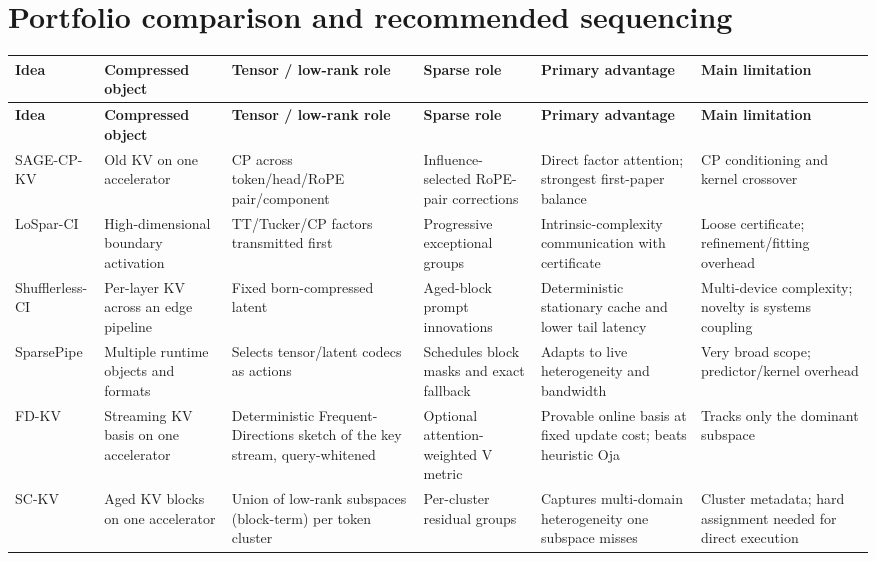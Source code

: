 \documentclass[10pt]{article}
\begin{document}
\section{Portfolio comparison and recommended sequencing}

\small
\renewcommand{\arraystretch}{1.18}
\begin{longtable}{@{}P{2.25cm}P{2.35cm}P{2.5cm}P{2.65cm}P{2.65cm}P{2.15cm}@{}}
\toprule
\textbf{Idea} & \textbf{Compressed object} & \textbf{Tensor / low-rank role} &
\textbf{Sparse role} & \textbf{Primary advantage} & \textbf{Main limitation} \\
\midrule
\endfirsthead
\toprule
\textbf{Idea} & \textbf{Compressed object} & \textbf{Tensor / low-rank role} &
\textbf{Sparse role} & \textbf{Primary advantage} & \textbf{Main limitation} \\
\midrule
\endhead
SAGE-CP-KV & Old KV on one accelerator & CP across token/head/RoPE pair/component &
Influence-selected RoPE-pair corrections & Direct factor attention; strongest first-paper
balance & CP conditioning and kernel crossover \\
LoSpar-CI & High-dimensional boundary activation & TT/Tucker/CP factors transmitted first &
Progressive exceptional groups & Intrinsic-complexity communication with certificate &
Loose certificate; refinement/fitting overhead \\
Shufflerless-CI & Per-layer KV across an edge pipeline & Fixed born-compressed latent &
Aged-block prompt innovations & Deterministic stationary cache and lower tail latency &
Multi-device complexity; novelty is systems coupling \\
SparsePipe & Multiple runtime objects and formats & Selects tensor/latent codecs as actions &
Schedules block masks and exact fallback & Adapts to live heterogeneity and bandwidth &
Very broad scope; predictor/kernel overhead \\
\midrule
FD-KV & Streaming KV basis on one accelerator & Deterministic Frequent-Directions sketch of the
key stream, query-whitened & Optional attention-weighted V metric & Provable online basis at
fixed update cost; beats heuristic Oja & Tracks only the dominant subspace \\
SC-KV & Aged KV blocks on one accelerator & Union of low-rank subspaces (block-term) per token
cluster & Per-cluster residual groups & Captures multi-domain heterogeneity one subspace misses &
Cluster metadata; hard assignment needed for direct execution \\
\bottomrule
\end{longtable}
\normalsize
\end{document}
